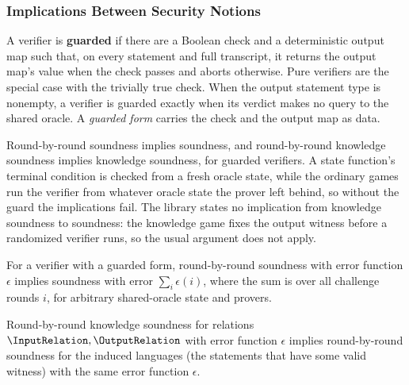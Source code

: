 \subsubsection{Implications Between Security Notions}

\begin{definition}
    \label{def:guarded_verifier}
    A verifier is \textbf{guarded} if there are a Boolean check and a deterministic output map
    such that, on every statement and full transcript, it returns the output map's value when the
    check passes and aborts otherwise. Pure verifiers are the special case with the trivially true
    check. When the output statement type is nonempty, a verifier is guarded exactly when its
    verdict makes no query to the shared oracle. A \emph{guarded form} carries the check and the
    output map as data.
    \leanok
\end{definition}

Round-by-round soundness implies soundness, and round-by-round knowledge soundness implies knowledge
soundness, for guarded verifiers. A state function's terminal condition is checked from a fresh
oracle state, while the ordinary games run the verifier from whatever oracle state the prover left
behind, so without the guard the implications fail. The library states no implication from
knowledge soundness to soundness: the knowledge game fixes the output witness before a randomized
verifier runs, so the usual argument does not apply.

\begin{theorem}
    \label{thm:rbr_soundness_implies_soundness}
    For a verifier with a guarded form, round-by-round soundness with error function \(\epsilon\)
    implies soundness with error \(\sum_i \epsilon(i)\), where the sum is over all challenge rounds
    \(i\), for arbitrary shared-oracle state and provers.
    \leanok
\end{theorem}

\begin{theorem}
    \label{thm:rbr_knowledge_soundness_implies_rbr_soundness}
    Round-by-round knowledge soundness for relations \(\InputRelation, \OutputRelation\) with error
    function \(\epsilon\) implies round-by-round soundness for the induced languages (the statements
    that have some valid witness) with the same error function \(\epsilon\).
    \leanok
\end{theorem}

